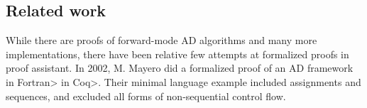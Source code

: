 \subsection{Related work}
While there are proofs of forward-mode AD algorithms\cite{huot2020correctness}\cite{barthe2020versatility} and many more implementations\cite{Shaikha2019}\cite{Margossian2019ARO}, there have been relative few attempts at formalized proofs in proof assistant.
In 2002, M. Mayero did a formalized proof of an AD framework in \<Fortran> in \<Coq>\cite{Mayero:CorrectnessProofAD}.
Their minimal language example included assignments and sequences, and excluded all forms of non-sequential control flow.



